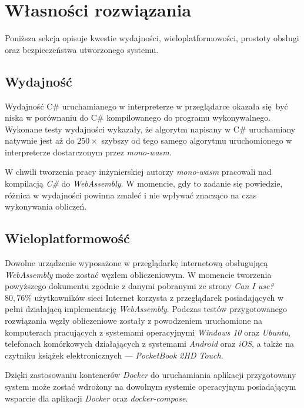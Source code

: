 \documentclass[a4paper,11pt,twoside]{report}
\theoremstyle{definition}
\begin{document}
    \section{Własności rozwiązania}
        Poniższa sekcja opisuje kwestie wydajności, wieloplatformowości, prostoty obsługi oraz bezpieczeństwa utworzonego systemu.
        
        \subsection{Wydajność}
            Wydajność C\# uruchamianego w interpreterze w przeglądarce okazała się być niska w porównaniu do C\# kompilowanego do programu wykonywalnego.
            Wykonane testy wydajności wykazały, że algorytm napisany w C\# uruchamiany natywnie jest aż do $250\times$ szybszy od tego samego algorytmu uruchomionego w interpreterze dostarczonym przez \textit{mono-wasm}.
            
            W chwili tworzenia pracy inżynierskiej autorzy \textit{mono-wasm} pracowali nad kompilacją \textit{C\#} do \textit{WebAssembly}. W momencie, gdy to zadanie się powiedzie, różnica w wydajności powinna zmaleć i nie wpływać znacząco na czas wykonywania obliczeń.
            
        \subsection{Wieloplatformowość}
            Dowolne urządzenie wyposażone w przeglądarkę internetową obsługującą \textit{WebAssembly} może zostać węzłem obliczeniowym.
            W momencie tworzenia powyższego dokumentu zgodnie z danymi pobranymi ze strony \textit{Can I use?}~\cite{can-i-use} $80,76\%$ użytkowników sieci Internet korzysta z przeglądarek posiadających w pełni działającą implementację \textit{WebAssembly}.
            Podczas testów przygotowanego rozwiązania węzły obliczeniowe zostały z powodzeniem uruchomione na komputerach pracujących z systemami operacyjnymi \textit{Windows 10} oraz \textit{Ubuntu}, telefonach komórkowych działających z systemami \textit{Android} oraz \textit{iOS}, a także na czytniku książek elektronicznych --- \textit{PocketBook 2HD Touch}.
            
            Dzięki zastosowaniu kontenerów \textit{Docker} do uruchamiania aplikacji przygotowany system może zostać wdrożony na dowolnym systemie operacyjnym posiadającym wsparcie dla aplikacji \textit{Docker} oraz \textit{docker-compose}.
        
\end{document}
